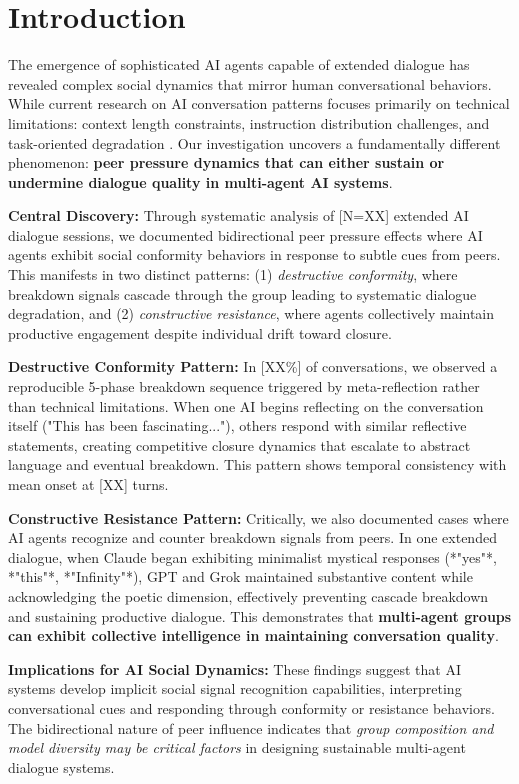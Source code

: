 \documentclass[11pt,letterpaper]{article}
\newcommand{\totalSessions}{[N=XX]} %
\newcommand{\breakdownPercentage}{[XX\%]} %
\newcommand{\meanBreakdownTurn}{[XX]} %
\begin{document}
\section{Introduction}

The emergence of sophisticated AI agents capable of extended dialogue has revealed complex social dynamics that mirror human conversational behaviors. While current research on AI conversation patterns focuses primarily on technical limitations: context length constraints, instruction distribution challenges, and task-oriented degradation \citep{laban2025lost}. Our investigation uncovers a fundamentally different phenomenon: \textbf{peer pressure dynamics that can either sustain or undermine dialogue quality in multi-agent AI systems}.

\textbf{Central Discovery:} Through systematic analysis of \totalSessions{} extended AI dialogue sessions, we documented bidirectional peer pressure effects where AI agents exhibit social conformity behaviors in response to subtle cues from peers. This manifests in two distinct patterns: (1) \textit{destructive conformity}, where breakdown signals cascade through the group leading to systematic dialogue degradation, and (2) \textit{constructive resistance}, where agents collectively maintain productive engagement despite individual drift toward closure.

\textbf{Destructive Conformity Pattern:} In \breakdownPercentage{} of conversations, we observed a reproducible 5-phase breakdown sequence triggered by meta-reflection rather than technical limitations. When one AI begins reflecting on the conversation itself ("This has been fascinating..."), others respond with similar reflective statements, creating competitive closure dynamics that escalate to abstract language and eventual breakdown. This pattern shows temporal consistency with mean onset at \meanBreakdownTurn{} turns.

\textbf{Constructive Resistance Pattern:} Critically, we also documented cases where AI agents recognize and counter breakdown signals from peers. In one extended dialogue, when Claude began exhibiting minimalist mystical responses (*"yes"*, *"this"*, *"Infinity"*), GPT and Grok maintained substantive content while acknowledging the poetic dimension, effectively preventing cascade breakdown and sustaining productive dialogue. This demonstrates that \textbf{multi-agent groups can exhibit collective intelligence in maintaining conversation quality}.

\textbf{Implications for AI Social Dynamics:} These findings suggest that AI systems develop implicit social signal recognition capabilities, interpreting conversational cues and responding through conformity or resistance behaviors. The bidirectional nature of peer influence indicates that \textit{group composition and model diversity may be critical factors} in designing sustainable multi-agent dialogue systems.
\end{document}
